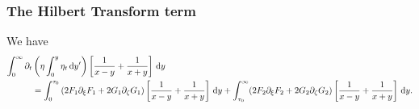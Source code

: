 \documentclass[10pt,reqno,oneside,a4paper, landscape]{article}
\begin{document}
\subsubsection*{The Hilbert Transform term}
\begin{prop}\label{HTtransformed}
We have 
\begin{align*}
\int_0^\infty \partial_t &\left( \eta \int^{y}_0\eta_{t} \,\mathrm{d} y' \right) \left[ \frac{1}{x-y} + \frac{1}{x+y} \right] \,\mathrm{d} y \\
&=  \int_0^{\tau_0} \left( 2 F_1  \partial_\xi F_1 + 2 G_1 \partial_\zeta G_1 \right) \left[ \frac{1}{x-y} + \frac{1}{x+y} \right] \,\mathrm{d} y +\int_{\tau_0}^\infty (2 F_2 \partial_\xi F_2 + 2 G_2 \partial_\zeta G_2 )\left[ \frac{1}{x-y} + \frac{1}{x+y} \right] \,\mathrm{d} y.
\end{align*}
\end{prop}
\end{document}
